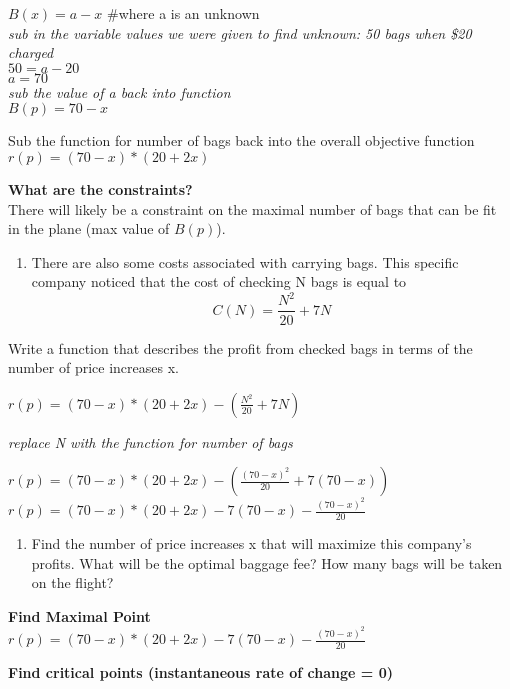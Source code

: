 \documentclass[11pt]{article}
\providecommand{\tightlist}{%
      \setlength{\itemsep}{0pt}\setlength{\parskip}{0pt}}
\begin{document}
\(B(x) = a - x\) \#where a is an unknown\\
\emph{sub in the variable values we were given to find unknown: 50 bags
when \$20 charged}\\
\(50 = a -20\)\\
\(a = 70\)\\
\emph{sub the value of a back into function}\\
\(B(p) = 70 - x\)

Sub the function for number of bags back into the overall objective
function\\
\(r(p) = (70 - x)*(20+2x)\)

\textbf{What are the constraints?}\\
There will likely be a constraint on the maximal number of bags that can
be fit in the plane (max value of \(B(p)\)).

    \begin{enumerate}
\def\labelenumi{(\alph{enumi})}
\setcounter{enumi}{1}
\tightlist
\item
  There are also some costs associated with carrying bags. This specific
  company noticed that the cost of checking N bags is equal to\\
  \[C(N) = \frac{N^2}{20} + 7N\]
\end{enumerate}

Write a function that describes the profit from checked bags in terms of
the number of price increases x.

    \(r(p) = (70 - x)*(20+2x) - (\frac{N^2}{20} + 7N)\)

\emph{replace N with the function for number of bags}

\(r(p) = (70 - x)*(20+2x) - (\frac{(70-x)^2}{20} + 7(70-x))\)\\
\(r(p) = (70 - x)*(20+2x) - 7(70-x) - \frac{(70-x)^2}{20}\)

    \begin{enumerate}
\def\labelenumi{(\alph{enumi})}
\setcounter{enumi}{2}
\tightlist
\item
  Find the number of price increases x that will maximize this company's
  profits. What will be the optimal baggage fee? How many bags will be
  taken on the flight?
\end{enumerate}

    \textbf{Find Maximal Point}\\
\(r(p) = (70 - x)*(20+2x) - 7(70-x) - \frac{(70-x)^2}{20}\)

\textbf{Find critical points (instantaneous rate of change = 0)}
\end{document}
